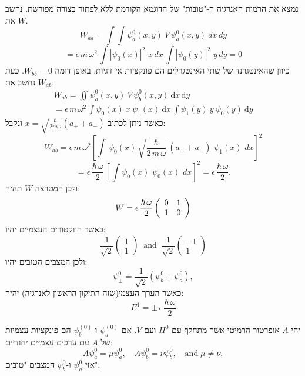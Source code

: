 \documentclass{tstextbook}
\begin{document}
\begin{example}
נמצא את הרמות האנרגיה ה-"טובות" של הדוגמא הקודמת ללא לפתור בצורה מפורשת. נחשב את \(W\).
$$W_{a a}=\int\int\psi_{a}^{0}(x,y)\ V\,\psi_{a}^{0}(x,y)\ d x\,d y$$$$=\epsilon\,m\,\omega^{2}\,\int|\psi_{0}(x)|^{2}\,\,x\,d x\,\int|\psi_{0}(y)|^{2}\,\,y\,d y=0$$
כיוון שהאינטגרנד של שתי האינטגרלים הם פונקציות אי זוגיות. באופן דומה \(W_{bb}=0\). כעת נחשב את \(W_{ab}\):
\begin{gather*}W_{a b}=\iint\psi_{a}^{0}(x,y)\ V\,\psi_{b}^{0}(x,y)\ \mathrm{d} x\,\mathrm{d} y\\=\epsilon\,m\,\omega^{2}\,\int\psi_{0}(x)\ x\ \psi_{1}(x)\ \mathrm{d} x\,\int\psi_{1}(y)\ y\ \psi_{0}(y)\ \mathrm{d} y 
\end{gather*}
כאשר ניתן לכתוב \(x=\sqrt{ \frac{\hbar}{2m\omega} }(a_{+}+a_{-})\) ונקבל:
$$W_{a b}=\epsilon\,m\,\omega^{2}\left[\int\,\psi_{0}(x)\,\sqrt{\frac{\hbar}{2\,m\,\omega}}\,(a_{+}+a_{-})\,\,\psi_{1}(x)\,\,d x\right]^{2}$$$$=\epsilon\,\frac{\hbar\,\omega}{2}\,\left[\int\psi_{0}(x)\,\,\psi_{0}(x)\,\,d x\right]^{2}=\epsilon\,\frac{\hbar\,\omega}{2}.$$
ולכן המטרצה \(W\) תהיה:
$$W=\epsilon\,\frac{\hbar\,\omega}{2}\left(\begin{array}{l l}{{0}}&{{1}}\\ {{1}}&{{0}}\end{array}\right)$$
כאשר הווקטורים העצמיים יהיו:
$${\frac{1}{\sqrt{2}}}{\left(\begin{array}{l}{1}\\ {1}\end{array}\right)}\;\;\mathrm{and}\;\;{\frac{1}{\sqrt{2}}}{\left(\begin{array}{l}{-1}\\ {1}\end{array}\right)}$$
ולכן המצבים הטובים יהיו:
$$\psi_{\pm}^{0}=\frac{1}{\sqrt{2}}\left(\psi_{b}^{0}\pm\psi_{a}^{0}\right),$$
כאשר הערך העצמי(שזה התיקון הראשון לאנרגיה) יהיה:
$$E^{1}=\pm\,\epsilon\,\frac{\hbar\,\omega}{2}$$

\end{example}
\begin{proposition}
יהי \(A\) אופרטור הרמיטי אשר מתחלף עם \(H^{0}\) ועם \(V\). אם \(\psi_{a}^{(0)}\) ו-\(\psi_{b}^{(0)}\) הם פונקציות עצמיות של \(A\) עם ערכים עצמיים יחודיים:
$$A\psi_{a}^{0}=\mu\psi_{a}^{0},\quad A\psi_{b}^{0}=\nu\psi_{b}^{0},\quad\mathrm{and}\;\mu\neq\nu,$$
אזי \(\psi_{a}^{0}\) ו-\(\psi_{b}^{0}\) המצבים "טובים".

\end{proposition}
\end{document}
